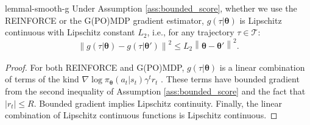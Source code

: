 \documentclass{article}
\makeatletter
\theoremstyle{remark}
\theoremstyle{definition}
\DeclareRobustCommand{\ie}{i.e.,\@\xspace}
\newcommand{\norm}[2][\infty]{\left\|#2\right\|_{#1}}
\newcommand{\vtheta}{\boldsymbol{\theta}}
\newcommand{\Tspace}{\mathcal{T}}
\newcommand{\score}[2]{\nabla\log\pi_{#1}(#2)}
\makeatother
\begin{document}
\begin{restatable}[]{lemma}{l-smooth-g}\label{lemma:gsmooth}
Under Assumption \ref{ass:bounded_score}, whether we use the REINFORCE or the G(PO)MDP gradient estimator, $g(\tau\vert\vtheta)$ is Lipschitz continuous with Lipschitz constant $L_2$, \ie for any trajectory $\tau\in\Tspace$:
\[
	\norm[]{g(\tau\vert\vtheta)-g(\tau\vert\vtheta')}^2 \leq L_2\norm[]{\vtheta-\vtheta'}^2.
\]
\end{restatable}
\begin{proof}
For both REINFORCE and G(PO)MDP, $g(\tau\vert\vtheta)$ is a linear combination of terms of the kind $\score{\vtheta}{a_t\vert s_t}\gamma^t r_t$ \cite{peters2008reinforcement}. These terms have bounded gradient from the second inequality of Assumption \ref{ass:bounded_score} and the fact that $|r_t|\leq R$. Bounded gradient implies Lipschitz continuity. Finally, the linear combination of Lipschitz continuous functions is Lipschitz continuous.
\end{proof}
\end{document}
